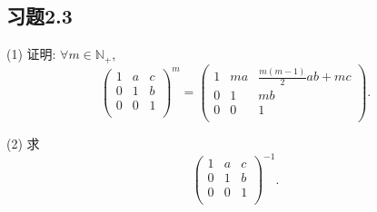 \documentclass[color=black,device=normal,lang=cn,mode=geye]{elegantnote}
\begin{document}
\subsection{习题2.3}
\begin{exercise}%
    (1) 证明: $\forall m\in\mathbb{N}_+$,
    \[\begin{pmatrix}
        1 & a & c \\
        0 & 1 & b \\
        0 & 0 & 1 \\
    \end{pmatrix}^m=\begin{pmatrix}
        1 & ma & \frac{m(m-1)}{2}ab+mc \\
        0 & 1 & mb \\
        0 & 0 & 1 \\
    \end{pmatrix}.\]

    (2) 求
    \[\begin{pmatrix}
        1 & a & c \\
        0 & 1 & b \\
        0 & 0 & 1 \\
    \end{pmatrix}^{-1}.\]
\end{exercise}
\end{document}
